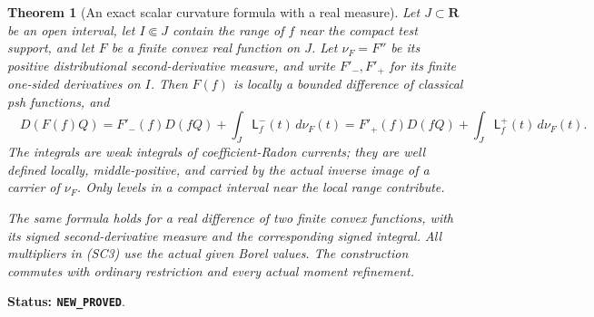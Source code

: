 \documentclass[11pt,a4paper]{article}
\numberwithin{equation}{section}
\newtheorem{theorem}{Theorem}[section]
\theoremstyle{definition}
\theoremstyle{remark}
\begin{document}
\begin{theorem}[An exact scalar curvature formula with a real measure]
\label{thm:r11-stieltjes-scalar-curvature}
Let $J\subset\mathbf R$ be an open interval, let $I\Subset J$
contain the range of $f$ near the compact test support, and let
$F$ be a finite convex real function on $J$.  Let $\nu_F=F''$
be its positive distributional second-derivative measure, and
write $F'_-,F'_+$ for its finite one-sided derivatives on $I$.
Then $F(f)$ is locally a bounded difference of classical psh
functions, and
\[
 \boxed{\quad
 D(F(f)Q)
  =F'_-(f)D(fQ)+\int_J\mathsf L_f^{-}(t)\,d\nu_F(t)
  =F'_+(f)D(fQ)+\int_J\mathsf L_f^{+}(t)\,d\nu_F(t).
 \quad}
 \tag{SC3}
\]
The integrals are weak integrals of coefficient-Radon currents;
they are well defined locally, middle-positive, and carried by
the actual inverse image of a carrier of $\nu_F$.
Only levels in a compact interval near the local range contribute.

The same formula holds for a real difference of two finite convex
functions, with its signed second-derivative measure and the
corresponding signed integral.  All multipliers in (SC3) use the
actual given Borel values.  The construction commutes with
ordinary restriction and every actual moment refinement.
\end{theorem}

\noindent\textbf{Status: \texttt{NEW\_PROVED}}.
\end{document}
